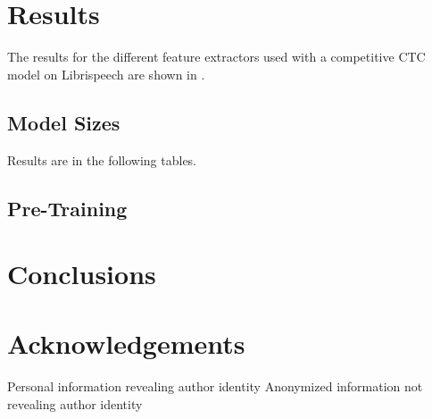 \documentclass{INTERSPEECH2023}
\begin{document}
\section{Results}
The results for the different feature extractors used with a competitive \gls{CTC} model on Librispeech are shown in .


\subsection{Model Sizes}
Results are in the following tables.





\subsection{\wvtwo Pre-Training}


\section{Conclusions}

\section{Acknowledgements}

\ifinterspeechfinal
     Personal information revealing author identity
\else
     Anonymized information not revealing author identity
\fi



\end{document}
